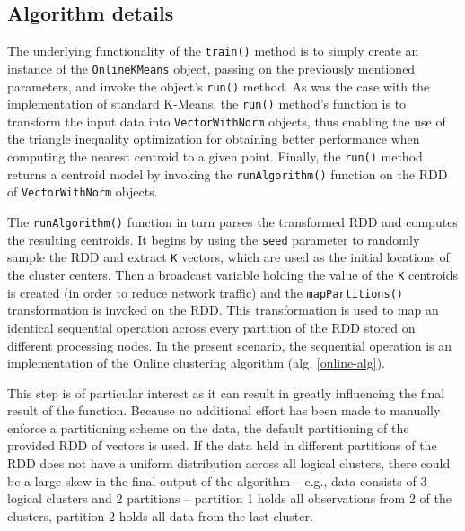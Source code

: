 \documentclass{l4proj}
\begin{document}
\subsection{Algorithm details}

The underlying functionality of the \texttt{train()} method is to simply create an instance of the \texttt{OnlineKMeans} object, passing on the previously mentioned parameters, and invoke the object's \texttt{run()} method. As was the case with the implementation of standard K-Means, the \texttt{run()} method's function is to transform the input data into \texttt{VectorWithNorm} objects, thus enabling the use of the triangle inequality optimization for obtaining better performance when computing the nearest centroid to a given point\cite{Triangle}. Finally, the \texttt{run()} method returns a centroid model by invoking the \texttt{runAlgorithm()} function on the RDD of \texttt{VectorWithNorm} objects.

The \texttt{runAlgorithm()} function in turn parses the transformed RDD and computes the resulting centroids. It begins by using the \texttt{seed} parameter to randomly sample the RDD and extract \texttt{K} vectors, which are used as the initial locations of the cluster centers. Then a broadcast variable holding the value of the \texttt{K} centroids is created (in order to reduce network traffic) and the \texttt{mapPartitions()} transformation is invoked on the RDD. This transformation is used to map an identical sequential operation across every partition of the RDD stored on different processing nodes. In the present scenario, the sequential operation is an implementation of the Online clustering algorithm (alg. \ref{online-alg}).

This step is of particular interest as it can result in greatly influencing the final result of the function. Because no additional effort has been made to manually enforce a partitioning scheme on the data, the default partitioning of the provided RDD of vectors is used. If the data held in different partitions of the RDD does not have a uniform distribution across all logical clusters, there could be a large skew in the final output of the algorithm -- e.g., data consists of 3 logical clusters and 2 partitions -- partition 1 holds all observations from 2 of the clusters, partition 2 holds all data from the last cluster.
\end{document}
